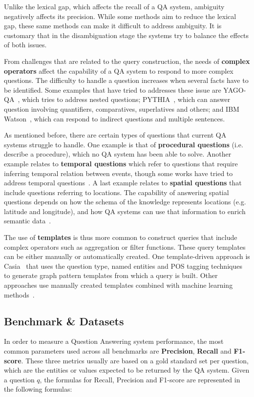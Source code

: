 Unlike the lexical gap, which affects the recall of a QA system, ambiguity negatively affects 
its precision. While some methods aim to reduce the lexical gap, these same methods can make it 
difficult to address ambiguity. It is customary that in the disambiguation stage the systems 
try to balance the effects of both issues.

From challenges that are related to the query construction, the needs of \textbf{complex operators} 
affect the capability of a QA system to respond to more complex questions. The difficulty to 
handle a question increases when several facts have to be identified. Some examples that have 
tried to addresses these issue are YAGO-QA~\cite{qa:AdolphsTSUW11}, which tries to address 
nested questions; PYTHIA~\cite{qa:UngerC11}, which can answer question involving quantifiers, 
comparatives, superlatives and others; and IBM Watson~\cite{qa:GliozzoK12}, which can respond 
to indirect questions and multiple sentences.

As mentioned before, there are certain types of questions that current QA systems struggle to 
handle. One example is that of \textbf{procedural questions} (i.e. describe a procedure), which 
no QA system has been able to solve. Another example relates to \textbf{temporal questions} 
which refer to questions that require inferring temporal relation between events, though some 
works have tried to address temporal questions~\cite{qa:Allen83,qa:FerrandezSKDFNITONMG11,
qa:MeloRN11}. A last example relates to \textbf{spatial questions} that include questions 
referring to locations. The capability of answering spatial questions depends on how the schema 
of the knowledge represents locations (e.g. latitude and longitude), and how QA systems can use 
that information to enrich semantic data~\cite{qa:YounisJTA12,qa:graph-2-ZouHWYHZ14}.

The use of \textbf{templates} is thus more common to construct \SPARQL{} queries that include 
complex operators such as aggregation or filter functions. These \SPARQL{} query templates can be 
either manually or automatically created. One template-driven approach is Casia~\cite{qa:shizhu2014casia} 
that uses the question type, named entities and POS tagging techniques to generate graph 
pattern templates from which a \SPARQL{} query is built. Other approaches use manually created 
templates combined with machine learning methods~\cite{qa:AbachaZ12}. 

\subsection{Benchmark \& Datasets}
\label{cap2:theoFrame/qakg/benchmarkDatasets}
In order to measure a Question Answering system performance, the most common parameters used 
across all benchmarks are \textbf{Precision}, \textbf{Recall} and \textbf{F1-score}. These 
three metrics usually are based on a gold standard set per question, which are the entities or 
values expected to be returned by the QA system. Given a question $q$, the formulas for Recall, 
Precision and F1-score are represented in the following formulas:

